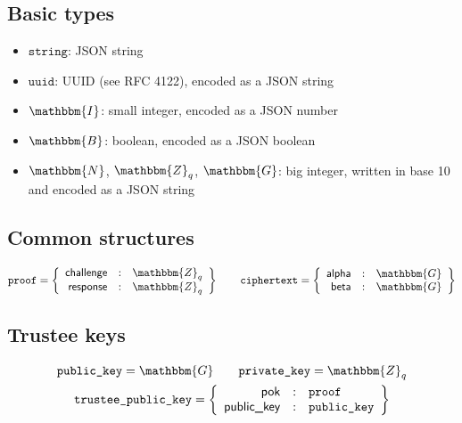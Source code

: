 \documentclass[a4paper]{article}
\newcommand{\G}{\mathbbm{G}}
\newcommand{\Z}{\mathbbm{Z}}
\newcommand{\N}{\mathbbm{N}}
\newcommand{\I}{\mathbbm{I}}
\newcommand{\B}{\mathbbm{B}}
\newcommand{\jstring}{\texttt{string}}
\newcommand{\uuid}{\texttt{uuid}}
\newcommand{\tpk}{\texttt{trustee\_public\_key}}
\begin{document}
\subsection{Basic types}
\label{basic-types}

\begin{itemize}
\item $\jstring$: JSON string
\item $\uuid$: UUID (see RFC 4122), encoded as a JSON string
\item $\I$: small integer, encoded as a JSON number
\item $\B$: boolean, encoded as a JSON boolean
\item $\N$, $\Z_q$, $\G$: big integer, written in base 10 and encoded as a
  JSON string
\end{itemize}

\subsection{Common structures}
\label{common}

\newcommand{\pk}{\texttt{public\_key}}
\newcommand{\sk}{\texttt{private\_key}}
\newcommand{\proof}{\texttt{proof}}
\newcommand{\iproof}{\texttt{iproof}}
\newcommand{\ciphertext}{\texttt{ciphertext}}

\newcommand{\pklabel}{\textsf{public\_key}}
\newcommand{\pok}{\textsf{pok}}
\newcommand{\challenge}{\textsf{challenge}}
\newcommand{\response}{\textsf{response}}
\newcommand{\alphalabel}{\textsf{alpha}}
\newcommand{\betalabel}{\textsf{beta}}
\newcommand{\Hash}{\mathcal{H}}

\begin{gather*}
  \proof=\left\{
    \begin{array}{rcl}
      \challenge&:&\Z_q\\
      \response&:&\Z_q
    \end{array}
  \right\}
  \qquad
  \ciphertext=\left\{
    \begin{array}{rcl}
      \alphalabel&:&\G\\
      \betalabel&:&\G
    \end{array}
  \right\}
\end{gather*}

\subsection{Trustee keys}
\label{trustee-keys}

\begin{gather*}
  \pk=\G\qquad\sk=\Z_q\\
  \tpk=\left\{
    \begin{array}{rcl}
      \pok&:&\proof\\
      \pklabel&:&\pk
    \end{array}
  \right\}
\end{gather*}
\end{document}
